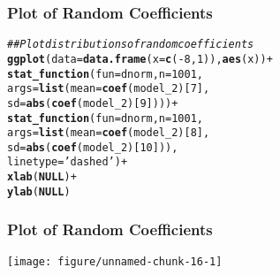 \documentclass{beamer}\usepackage[]{graphicx}\usepackage[]{color}
\makeatletter
\def\maxwidth{ %
  \ifdim\Gin@nat@width>\linewidth
    \linewidth
  \else
    \Gin@nat@width
  \fi
}
\newcommand{\hlnum}[1]{\textcolor[rgb]{0.686,0.059,0.569}{#1}}%
\newcommand{\hlstr}[1]{\textcolor[rgb]{0.192,0.494,0.8}{#1}}%
\newcommand{\hlcom}[1]{\textcolor[rgb]{0.678,0.584,0.686}{\textit{#1}}}%
\newcommand{\hlopt}[1]{\textcolor[rgb]{0,0,0}{#1}}%
\newcommand{\hlstd}[1]{\textcolor[rgb]{0.345,0.345,0.345}{#1}}%
\newcommand{\hlkwa}[1]{\textcolor[rgb]{0.161,0.373,0.58}{\textbf{#1}}}%
\newcommand{\hlkwc}[1]{\textcolor[rgb]{0.333,0.667,0.333}{#1}}%
\newcommand{\hlkwd}[1]{\textcolor[rgb]{0.737,0.353,0.396}{\textbf{#1}}}%
\newenvironment{kframe}{%
 \def\at@end@of@kframe{}%
 \ifinner\ifhmode%
  \def\at@end@of@kframe{\end{minipage}}%
  \begin{minipage}{\columnwidth}%
 \fi\fi%
 \def\FrameCommand##1{\hskip\@totalleftmargin \hskip-\fboxsep
 \colorbox{shadecolor}{##1}\hskip-\fboxsep
     \hskip-\linewidth \hskip-\@totalleftmargin \hskip\columnwidth}%
 \MakeFramed {\advance\hsize-\width
   \@totalleftmargin\z@ \linewidth\hsize
   \@setminipage}}%
 {\par\unskip\endMakeFramed%
 \at@end@of@kframe}
\newenvironment{knitrout}{}{} %
\makeatother
\begin{document}
\begin{frame}[fragile]\frametitle{Plot of Random Coefficients}
\begin{knitrout}\footnotesize
{}\color{fgcolor}\begin{kframe}
\begin{alltt}
\hlcom{## Plot distributions of random coefficients}
\hlkwd{ggplot}\hlstd{(}\hlkwc{data} \hlstd{=} \hlkwd{data.frame}\hlstd{(}\hlkwc{x} \hlstd{=} \hlkwd{c}\hlstd{(}\hlopt{-}\hlnum{8}\hlstd{,} \hlnum{1}\hlstd{)),} \hlkwd{aes}\hlstd{(x))} \hlopt{+}
  \hlkwd{stat_function}\hlstd{(}\hlkwc{fun} \hlstd{= dnorm,} \hlkwc{n} \hlstd{=} \hlnum{1001}\hlstd{,}
                \hlkwc{args} \hlstd{=} \hlkwd{list}\hlstd{(}\hlkwc{mean} \hlstd{=} \hlkwd{coef}\hlstd{(model_2)[}\hlnum{7}\hlstd{],}
                            \hlkwc{sd} \hlstd{=} \hlkwd{abs}\hlstd{(}\hlkwd{coef}\hlstd{(model_2)[}\hlnum{9}\hlstd{])))} \hlopt{+}
  \hlkwd{stat_function}\hlstd{(}\hlkwc{fun} \hlstd{= dnorm,} \hlkwc{n} \hlstd{=} \hlnum{1001}\hlstd{,}
                \hlkwc{args} \hlstd{=} \hlkwd{list}\hlstd{(}\hlkwc{mean} \hlstd{=}\hlkwd{coef}\hlstd{(model_2)[}\hlnum{8}\hlstd{],}
                            \hlkwc{sd} \hlstd{=} \hlkwd{abs}\hlstd{(}\hlkwd{coef}\hlstd{(model_2)[}\hlnum{10}\hlstd{])),}
                \hlkwc{linetype} \hlstd{=} \hlstr{'dashed'}\hlstd{)} \hlopt{+}
  \hlkwd{xlab}\hlstd{(}\hlkwa{NULL}\hlstd{)} \hlopt{+}
  \hlkwd{ylab}\hlstd{(}\hlkwa{NULL}\hlstd{)}
\end{alltt}
\end{kframe}
\end{knitrout}
\end{frame}

\begin{frame}[fragile]\frametitle{Plot of Random Coefficients}
\begin{knitrout}\footnotesize
{}\color{fgcolor}

{\centering \texttt{[image: figure/unnamed-chunk-16-1]} 

}


\end{knitrout}
\end{frame}
\end{document}
